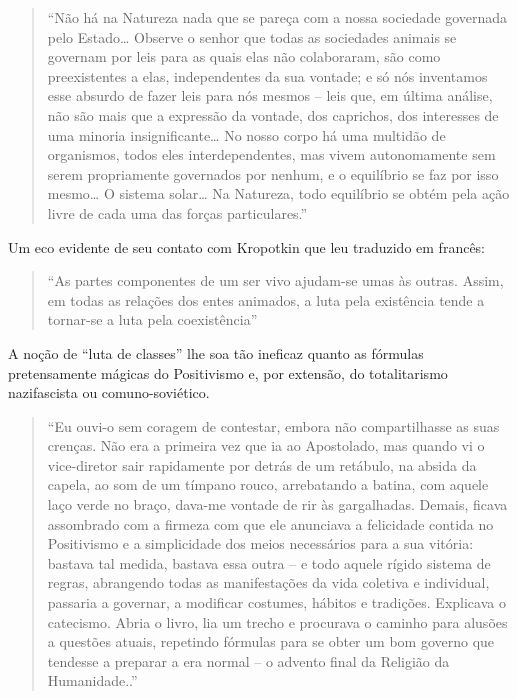 \documentclass[
  letterpaper,
  DIV=11,
  numbers=noendperiod]{scrreprt}
\begin{document}
\begin{quote}
``Não há na Natureza nada que se pareça com a nossa sociedade governada
pelo Estado\ldots{} Observe o senhor que todas as sociedades animais se
governam por leis para as quais elas não colaboraram, são como
preexistentes a elas, independentes da sua vontade; e só nós inventamos
esse absurdo de fazer leis para nós mesmos -- leis que, em última
análise, não são mais que a expressão da vontade, dos caprichos, dos
interesses de uma minoria insignificante\ldots{} No nosso corpo há uma
multidão de organismos, todos eles interdependentes, mas vivem
autonomamente sem serem propriamente governados por nenhum, e o
equilíbrio se faz por isso mesmo\ldots{} O sistema solar\ldots{} Na
Natureza, todo equilíbrio se obtém pela ação livre de cada uma das
forças particulares.''
\end{quote}

Um eco evidente de seu contato com Kropotkin que leu traduzido em
francês:

\begin{quote}
``As partes componentes de um ser vivo ajudam-se umas às outras. Assim,
em todas as relações dos entes animados, a luta pela existência tende a
tornar-se a luta pela coexistência''
\end{quote}

A noção de ``luta de classes'' lhe soa tão ineficaz quanto as fórmulas
pretensamente mágicas do Positivismo e, por extensão, do totalitarismo
nazifascista ou comuno-soviético.

\begin{quote}
``Eu ouvi-o sem coragem de contestar, embora não compartilhasse as suas
crenças. Não era a primeira vez que ia ao Apostolado, mas quando vi o
vice-diretor sair rapidamente por detrás de um retábulo, na absida da
capela, ao som de um tímpano rouco, arrebatando a batina, com aquele
laço verde no braço, dava-me vontade de rir às gargalhadas. Demais,
ficava assombrado com a firmeza com que ele anunciava a felicidade
contida no Positivismo e a simplicidade dos meios necessários para a sua
vitória: bastava tal medida, bastava essa outra -- e todo aquele rígido
sistema de regras, abrangendo todas as manifestações da vida coletiva e
individual, passaria a governar, a modificar costumes, hábitos e
tradições. Explicava o catecismo. Abria o livro, lia um trecho e
procurava o caminho para alusões a questões atuais, repetindo fórmulas
para se obter um bom governo que tendesse a preparar a era normal -- o
advento final da Religião da Humanidade..''
\end{quote}
\end{document}

